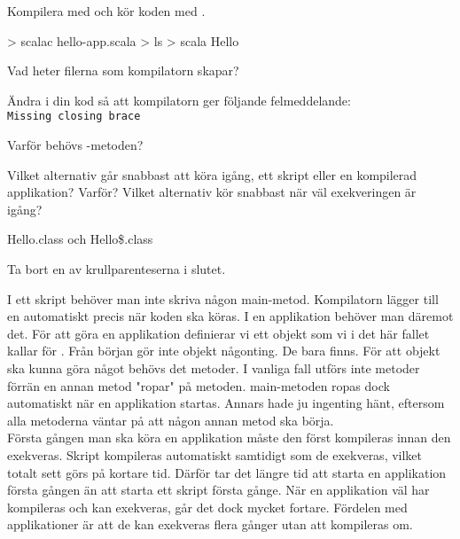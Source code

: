 \Subtask Kompilera med  och kör koden med .
\begin{REPLnonum}
> scalac hello-app.scala
> ls
> scala Hello
\end{REPLnonum}
Vad heter filerna som kompilatorn skapar?

\Subtask Ändra i din kod så att kompilatorn ger följande felmeddelande: \\
\texttt{Missing closing brace}

\Subtask\Pen Varför behövs -metoden?

\Subtask\Pen Vilket alternativ går snabbast att köra igång, ett skript eller en kompilerad applikation? Varför? Vilket alternativ kör snabbast när väl exekveringen är igång?


\SOLUTION


\TaskSolved \what
 

\SubtaskSolved  Hello.class och Hello\$.class

\SubtaskSolved  Ta bort en av krullparenteserna i slutet.

\SubtaskSolved  I ett skript behöver man inte skriva någon main-metod. Kompilatorn lägger till en automatiskt precis när koden ska köras. I en applikation behöver man däremot det. För att göra en applikation definierar vi ett objekt som vi i det här fallet kallar för . Från början gör inte objekt någonting. De bara finns. För att objekt ska kunna göra något behövs det metoder. I vanliga fall utförs inte metoder förrän en annan metod "ropar" på metoden. main-metoden ropas dock automatiskt när en applikation startas. Annars hade ju ingenting hänt, eftersom alla metoderna väntar på att någon annan metod ska börja. \\
\SubtaskSolved  Första gången man ska köra en applikation måste den först kompileras innan den exekveras. Skript kompileras automatiskt samtidigt som de exekveras, vilket totalt sett görs på kortare tid. Därför tar det längre tid att starta en applikation första gången än att starta ett skript första gånge. När en applikation väl har kompileras och kan exekveras, går det dock mycket fortare. Fördelen med applikationer är att de kan exekveras flera gånger utan att kompileras om.



\QUESTEND









